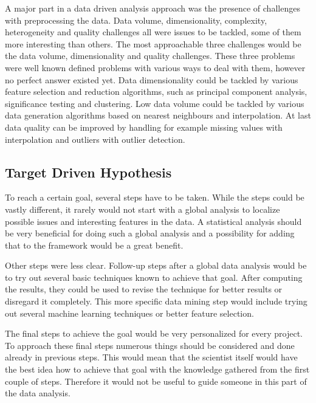 \documentclass[10pt,a4paper]{article}
\begin{document}
	A major part in a data driven analysis approach was the presence of challenges with preprocessing the data. Data volume, dimensionality, complexity, heterogeneity and quality challenges all were issues to be tackled, some of them more interesting than others. The most approachable three challenges would be the data volume, dimensionality and quality challenges. These three problems were well known defined problems with various ways to deal with them, however no perfect answer existed yet. Data dimensionality could be tackled by various feature selection and reduction algorithms, such as principal component analysis, significance testing and clustering. Low data volume could be tackled by various data generation algorithms based on nearest neighbours and interpolation. At last data quality can be improved by handling for example missing values with interpolation and outliers with outlier detection.
	
	\subsection{Target Driven Hypothesis}
	\label{subsec:TargetDrivenHypothesis}
	
	To reach a certain goal, several steps have to be taken. While the steps could be vastly different, it rarely would not start with a global analysis to localize possible issues and interesting features in the data. A statistical analysis should be very beneficial for doing such a global analysis and a possibility for adding that to the framework would be a great benefit.
	
	Other steps were less clear. Follow-up steps after a global data analysis would be to try out several basic techniques known to achieve that goal. After computing the results, they could be used to revise the technique for better results or disregard it completely. This more specific data mining step would include trying out several machine learning techniques or better feature selection.
	
	The final steps to achieve the goal would be very personalized for every project. To approach these final steps numerous things should be considered and done already in previous steps. This would mean that the scientist itself would have the best idea how to achieve that goal with the knowledge gathered from the first couple of steps. Therefore it would not be useful to guide someone in this part of the data analysis.
		
\end{document}
